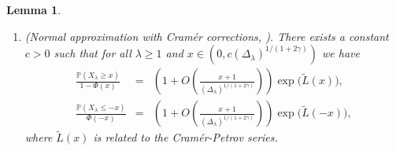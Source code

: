 \documentclass[bj,authoryear,noshowframe]{imsart}
\theoremstyle{plain}
\newtheorem{lemma}[theorem]{Lemma}
\theoremstyle{remark}
\newcommand{\IP}{\mathbb{P}}
\begin{document}
\begin{appendix}
\begin{lemma}
\begin{enumerate}
  corollary of \cite[Lemma~2.4]{saulis}).
  For any $x\ge0$ and sufficiently large $\lambda$, 
\begin{equation}
\IP(|X_\lambda|\geq x)\le2\exp\left(-\frac14\min\left( \frac{x^2}{2^{1/(1+\gamma)}},(x\Delta_\lambda)^{1/(1+\gamma)}\right) \right).
\end{equation} 
\item (Normal approximation with Cram\'er corrections,
  \cite[Lemma~2.3]{saulis}). 
 There exists a
  constant $c>0$ such that for all $\lambda \geq 1$ and $x\in(0,c(\Delta_\lambda)^{1/(1+2\gamma)})$ we have 
\begin{eqnarray*}
  \frac{\IP(X_\lambda\geq x)}{1-\Phi(x)}&=&
  \left(1+O\left(\frac{x+1}{(\Delta_\lambda)^{1/(1+2\gamma)}}\right)\right)
  \exp \big( \tilde{L}(x) \big),
  \\
  \frac{\IP(X_\lambda\leq -x)}{\Phi(-x)}&=&
  \left(1+O\left(\frac{x+1}{(\Delta_\lambda)^{1/(1+2\gamma)}}\right)\right)
  \exp \big( \tilde{L}(-x) \big),
\end{eqnarray*}
where $\tilde{L}(x)$ is related to the Cram\'er-Petrov series. 
\end{enumerate}
\end{lemma}
\end{appendix}


\end{document}
